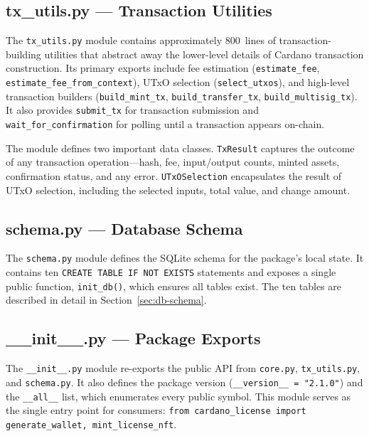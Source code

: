 \subsection{tx\_utils.py --- Transaction Utilities}

The \texttt{tx\_utils.py} module contains approximately 800~lines of
transaction-building utilities that abstract away the lower-level details of
Cardano transaction construction.  Its primary exports include fee
estimation (\texttt{estimate\_fee}, \texttt{estimate\_fee\_from\_context}),
UTxO selection (\texttt{select\_utxos}), and high-level transaction builders
(\texttt{build\_mint\_tx}, \texttt{build\_transfer\_tx},
\texttt{build\_multisig\_tx}).  It also provides
\texttt{submit\_tx} for transaction submission and
\texttt{wait\_for\_confirmation} for polling until a transaction appears
on-chain.

The module defines two important data classes.  \texttt{TxResult} captures
the outcome of any transaction operation---hash, fee, input/output counts,
minted assets, confirmation status, and any error.  \texttt{UTxOSelection}
encapsulates the result of UTxO selection, including the selected inputs,
total value, and change amount.

\subsection{schema.py --- Database Schema}

The \texttt{schema.py} module defines the SQLite schema for the package's
local state.  It contains ten \texttt{CREATE TABLE IF NOT EXISTS} statements
and exposes a single public function, \texttt{init\_db()}, which ensures all
tables exist.  The ten tables are described in detail in
Section~\ref{sec:db-schema}.

\subsection{\_\_init\_\_.py --- Package Exports}

The \texttt{\_\_init\_\_.py} module re-exports the public API from
\texttt{core.py}, \texttt{tx\_utils.py}, and \texttt{schema.py}.  It also
defines the package version (\texttt{\_\_version\_\_ = "2.1.0"}) and the
\texttt{\_\_all\_\_} list, which enumerates every public symbol.  This
module serves as the single entry point for consumers:
\texttt{from cardano\_license import generate\_wallet, mint\_license\_nft}.


